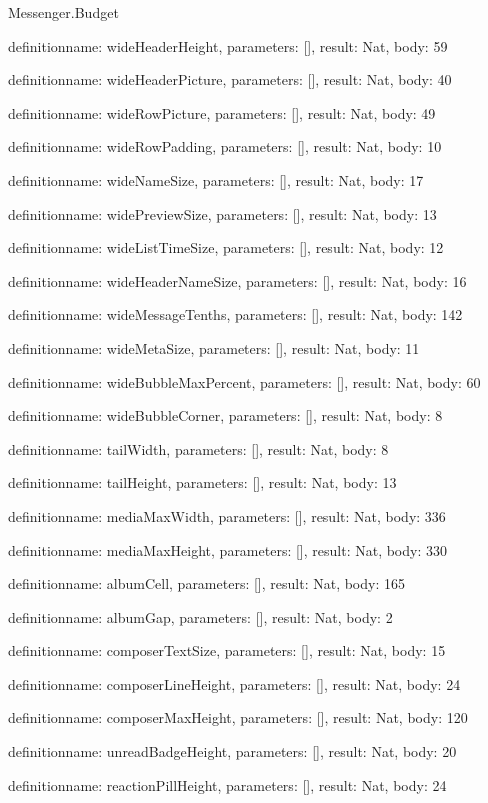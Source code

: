\begin{lexlean}{Messenger.Budget}
\begin{semanticmodule}
definition{name: wideHeaderHeight, parameters: [], result: Nat, body: 59}

definition{name: wideHeaderPicture, parameters: [], result: Nat, body: 40}

definition{name: wideRowPicture, parameters: [], result: Nat, body: 49}

definition{name: wideRowPadding, parameters: [], result: Nat, body: 10}

definition{name: wideNameSize, parameters: [], result: Nat, body: 17}

definition{name: widePreviewSize, parameters: [], result: Nat, body: 13}

definition{name: wideListTimeSize, parameters: [], result: Nat, body: 12}

definition{name: wideHeaderNameSize, parameters: [], result: Nat, body: 16}

definition{name: wideMessageTenths, parameters: [], result: Nat, body: 142}

definition{name: wideMetaSize, parameters: [], result: Nat, body: 11}

definition{name: wideBubbleMaxPercent, parameters: [], result: Nat, body: 60}

definition{name: wideBubbleCorner, parameters: [], result: Nat, body: 8}

definition{name: tailWidth, parameters: [], result: Nat, body: 8}

definition{name: tailHeight, parameters: [], result: Nat, body: 13}

definition{name: mediaMaxWidth, parameters: [], result: Nat, body: 336}

definition{name: mediaMaxHeight, parameters: [], result: Nat, body: 330}

definition{name: albumCell, parameters: [], result: Nat, body: 165}

definition{name: albumGap, parameters: [], result: Nat, body: 2}

definition{name: composerTextSize, parameters: [], result: Nat, body: 15}

definition{name: composerLineHeight, parameters: [], result: Nat, body: 24}

definition{name: composerMaxHeight, parameters: [], result: Nat, body: 120}

definition{name: unreadBadgeHeight, parameters: [], result: Nat, body: 20}

definition{name: reactionPillHeight, parameters: [], result: Nat, body: 24}


\end{semanticmodule}
\end{lexlean}
